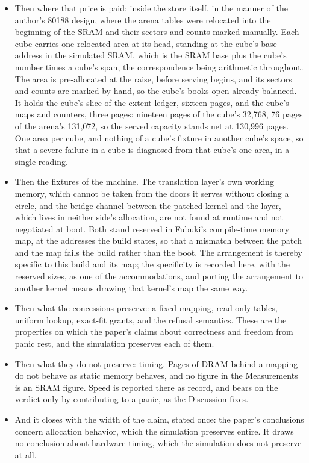 \documentclass[11pt]{article}
\begin{document}
\begin{itemize}
\item Then where that price is paid: inside the store itself, in the manner of the author's 80188 design, where the arena tables were relocated into the beginning of the SRAM and their sectors and counts marked manually. Each cube carries one relocated area at its head, standing at the cube's base address in the simulated SRAM, which is the SRAM base plus the cube's number times a cube's span, the correspondence being arithmetic throughout. The area is pre-allocated at the raise, before serving begins, and its sectors and counts are marked by hand, so the cube's books open already balanced. It holds the cube's slice of the extent ledger, sixteen pages, and the cube's maps and counters, three pages: nineteen pages of the cube's 32,768, 76 pages of the arena's 131,072, so the served capacity stands net at 130,996 pages. One area per cube, and nothing of a cube's fixture in another cube's space, so that a severe failure in a cube is diagnosed from that cube's one area, in a single reading.
\item Then the fixtures of the machine. The translation layer's own working memory, which cannot be taken from the doors it serves without closing a circle, and the bridge channel between the patched kernel and the layer, which lives in neither side's allocation, are not found at runtime and not negotiated at boot. Both stand reserved in Fubuki's compile-time memory map, at the addresses the build states, so that a mismatch between the patch and the map fails the build rather than the boot. The arrangement is thereby specific to this build and its map; the specificity is recorded here, with the reserved sizes, as one of the accommodations, and porting the arrangement to another kernel means drawing that kernel's map the same way.
\item Then what the concessions preserve: a fixed mapping, read-only tables, uniform lookup, exact-fit grants, and the refusal semantics. These are the properties on which the paper's claims about correctness and freedom from panic rest, and the simulation preserves each of them.
\item Then what they do not preserve: timing. Pages of DRAM behind a mapping do not behave as static memory behaves, and no figure in the Measurements is an SRAM figure. Speed is reported there as record, and bears on the verdict only by contributing to a panic, as the Discussion fixes.
\item And it closes with the width of the claim, stated once: the paper's conclusions concern allocation behavior, which the simulation preserves entire. It draws no conclusion about hardware timing, which the simulation does not preserve at all.
\end{itemize}
\end{document}
